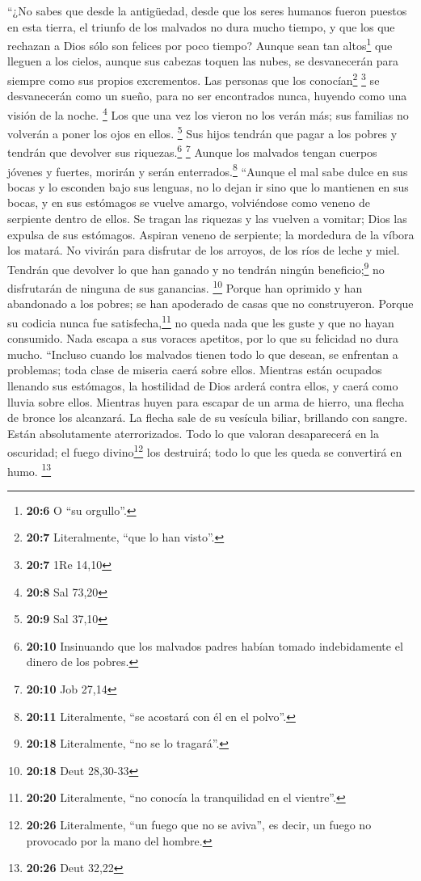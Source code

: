  ``¿No sabes que desde la antigüedad, desde que los seres
humanos fueron puestos en esta tierra,  el triunfo de los
malvados no dura mucho tiempo, y que los que rechazan a Dios sólo son
felices por poco tiempo?  Aunque sean tan altos\footnote{\textbf{20:6}
  O ``su orgullo''.} que lleguen a los cielos, aunque sus cabezas toquen
las nubes,  se desvanecerán para siempre como sus propios
excrementos. Las personas que los conocían\footnote{\textbf{20:7}
  Literalmente, ``que lo han visto''.} \footnote{\textbf{20:7} 1Re 14,10}
 se desvanecerán como un sueño, para no ser encontrados
nunca, huyendo como una visión de la noche. \footnote{\textbf{20:8} Sal
  73,20}  Los que una vez los vieron no los verán más; sus
familias no volverán a poner los ojos en ellos. \footnote{\textbf{20:9}
  Sal 37,10}  Sus hijos tendrán que pagar a los pobres y
tendrán que devolver sus riquezas.\footnote{\textbf{20:10} Insinuando
  que los malvados padres habían tomado indebidamente el dinero de los
  pobres.} \footnote{\textbf{20:10} Job 27,14}  Aunque
los malvados tengan cuerpos jóvenes y fuertes, morirán y serán
enterrados.\footnote{\textbf{20:11} Literalmente, ``se acostará con él
  en el polvo''.}  ``Aunque el mal sabe dulce en sus
bocas y lo esconden bajo sus lenguas,  no lo dejan ir
sino que lo mantienen en sus bocas,  y en sus estómagos
se vuelve amargo, volviéndose como veneno de serpiente dentro de ellos.
 Se tragan las riquezas y las vuelven a vomitar; Dios las
expulsa de sus estómagos.  Aspiran veneno de serpiente;
la mordedura de la víbora los matará.  No vivirán para
disfrutar de los arroyos, de los ríos de leche y miel. 
Tendrán que devolver lo que han ganado y no tendrán ningún
beneficio;\footnote{\textbf{20:18} Literalmente, ``no se lo tragará''.}
no disfrutarán de ninguna de sus ganancias. \footnote{\textbf{20:18}
  Deut 28,30-33}  Porque han oprimido y han abandonado a
los pobres; se han apoderado de casas que no construyeron.
 Porque su codicia nunca fue satisfecha,\footnote{\textbf{20:20}
  Literalmente, ``no conocía la tranquilidad en el vientre''.} no queda
nada que les guste y que no hayan consumido.  Nada escapa
a sus voraces apetitos, por lo que su felicidad no dura mucho.
 ``Incluso cuando los malvados tienen todo lo que desean,
se enfrentan a problemas; toda clase de miseria caerá sobre ellos.
 Mientras están ocupados llenando sus estómagos, la
hostilidad de Dios arderá contra ellos, y caerá como lluvia sobre ellos.
 Mientras huyen para escapar de un arma de hierro, una
flecha de bronce los alcanzará.  La flecha sale de su
vesícula biliar, brillando con sangre. Están absolutamente
aterrorizados.  Todo lo que valoran desaparecerá en la
oscuridad; el fuego divino\footnote{\textbf{20:26} Literalmente, ``un
  fuego que no se aviva'', es decir, un fuego no provocado por la mano
  del hombre.} los destruirá; todo lo que les queda se convertirá en
humo. \footnote{\textbf{20:26} Deut 32,22}

